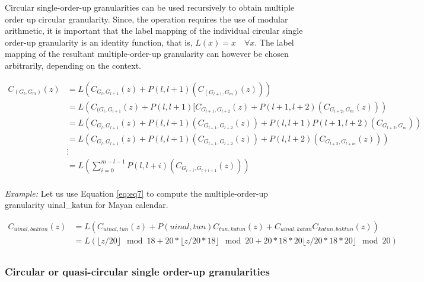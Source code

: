 \documentclass[12pt]{article}
\begin{document}
Circular single-order-up granularities can be used recursively to obtain multiple order up circular granularity. Since, the operation requires the use of modular arithmetic, it is important that the label mapping of the individual circular single order-up granularity is an identity function, that is, \(L(x) = x\quad \forall x\). The label mapping of the resultant multiple-order-up granularity can however be chosen arbitrarily, depending on the context.

\begin{equation} \label{eq:eq7}
\begin{split}
C_{(G_l,G_m)}(z) & = L(C_{G_l,G_{l+1}}(z) + P(l, l+1)(C_{(G_{l+1},G_m)}(z))) \\  
  & =   L(C_{(G_l,G_{l+1}}(z) + P(l, l+1)[ C_{G_{l+1},G_{l+2}}(z) + P(l+1, l+2)( C_{G_{l+2}, G_m}(z))) \\
  & =  L(C_{G_l,G_{l+1}}(z) + P(l, l+1)(C_{G_{l+1},G_{l+2}}(z)) + P(l, l+1)P(l+1, l+2)(C_{G_{l+2}, G_{m}}))\\
  & =  L(C_{G_l,G_{l+1}}(z) + P(l, l+1)(C_{G_{l+1},G_{l+2}}(z)) + P(l, l+2)(C_{G_{l+2},G_{l+m}}(z)))\\
  &\vdots\\
  & = L(\sum_{i=0}^{m - l - 1} P(l, l+i)(C_{G_{l+i},G_{l+i+1}}(z)))\\
\end{split}
\end{equation}

\emph{Example:} Let us use Equation \ref{eq:eq7} to compute the multiple-order-up granularity uinal\_katun for Mayan calendar.

\begin{equation} \label{eq8}
\begin{split}
C_{uinal, baktun}(z) & = L(C_{uinal, tun}(z) + P(uinal, tun)C_{tun,katun}(z) + C_{uinal, katun}C_{katun, baktun}(z)) \\
              & = L(\lfloor z/20\rfloor \mod 18  +
              20*\lfloor z/20*18\rfloor \mod 20 +
              20*18*20\lfloor z/20*18*20\rfloor \mod 20) \\
\end{split}
\end{equation}

\hypertarget{circular-or-quasi-circular-single-order-up-granularities}{%
\subsubsection{Circular or quasi-circular single order-up granularities}\label{circular-or-quasi-circular-single-order-up-granularities}}
\end{document}
